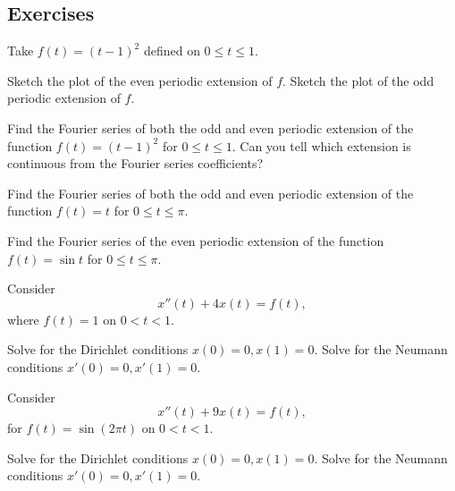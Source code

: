 \subsection{Exercises}

\begin{exercise}
Take $f(t) = {(t-1)}^2$ defined on $0 \leq t \leq 1$.
\begin{tasks}
\task Sketch the plot of the even periodic extension of $f$.
\task Sketch the plot of the odd periodic extension of $f$.
\end{tasks}
\end{exercise}

\begin{exercise}
Find the Fourier series of both the odd and even
periodic extension of 
the function $f(t) = {(t-1)}^2$ for $0 \leq t \leq 1$.
Can you tell which extension is continuous from the Fourier series
coefficients?
\end{exercise}

\begin{exercise}
Find the Fourier series of both the odd and even periodic extension of 
the function $f(t) = t$ for $0 \leq t \leq \pi$.
\end{exercise}

\begin{exercise}
Find the Fourier series of the even periodic extension of 
the function $f(t) = \sin t$ for $0 \leq t \leq \pi$.
\end{exercise}

\begin{exercise}
Consider
\begin{equation*}
x''(t) + 4 x(t) = f(t) ,
\end{equation*}
where $f(t) = 1$ on $0 < t < 1$.
\begin{tasks}
\task Solve for the Dirichlet conditions $x(0)=0, x(1) = 0$.
\task Solve for the Neumann conditions $x'(0)=0, x'(1) = 0$.
\end{tasks}
\end{exercise}

\begin{exercise}
Consider
\begin{equation*}
x''(t) + 9 x(t) = f(t) ,
\end{equation*}
for $f(t) = \sin (2\pi t)$ on $0 < t < 1$.
\begin{tasks}
\task Solve for the Dirichlet conditions $x(0)=0, x(1) = 0$.
\task Solve for the Neumann conditions $x'(0)=0, x'(1) = 0$.
\end{tasks}
\end{exercise}

